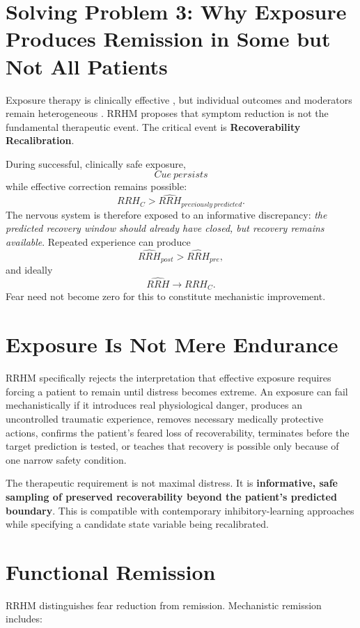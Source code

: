 \documentclass[11pt]{article}
\begin{document}
\section{Solving Problem 3: Why Exposure Produces Remission in Some but Not All Patients}

Exposure therapy is clinically effective \cite{odgers2022}, but individual outcomes and moderators remain heterogeneous \cite{bohnlein2020}. RRHM proposes that symptom reduction is not the fundamental therapeutic event. The critical event is \textbf{Recoverability Recalibration}.

During successful, clinically safe exposure,
\[
Cue\ persists
\]
while effective correction remains possible:
\[
RRH_C>\widehat{RRH}_{previously\ predicted}.
\]
The nervous system is therefore exposed to an informative discrepancy: \emph{the predicted recovery window should already have closed, but recovery remains available}. Repeated experience can produce
\[
\widehat{RRH}_{post}>\widehat{RRH}_{pre},
\]
and ideally
\[
\widehat{RRH}\rightarrow RRH_C.
\]
Fear need not become zero for this to constitute mechanistic improvement.

\section{Exposure Is Not Mere Endurance}

RRHM specifically rejects the interpretation that effective exposure requires forcing a patient to remain until distress becomes extreme. An exposure can fail mechanistically if it introduces real physiological danger, produces an uncontrolled traumatic experience, removes necessary medically protective actions, confirms the patient's feared loss of recoverability, terminates before the target prediction is tested, or teaches that recovery is possible only because of one narrow safety condition.

The therapeutic requirement is not maximal distress. It is \textbf{informative, safe sampling of preserved recoverability beyond the patient's predicted boundary}. This is compatible with contemporary inhibitory-learning approaches while specifying a candidate state variable being recalibrated.

\section{Functional Remission}

RRHM distinguishes fear reduction from remission. Mechanistic remission includes:
\end{document}
